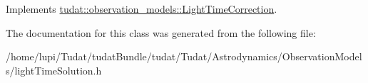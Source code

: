 Implements \hyperlink{classtudat_1_1observation__models_1_1LightTimeCorrection_a75c56b78e1603b14387991fdfffac1ce}{tudat\+::observation\+\_\+models\+::\+Light\+Time\+Correction}.



The documentation for this class was generated from the following file\+:\begin{DoxyCompactItemize}
\item 
/home/lupi/\+Tudat/tudat\+Bundle/tudat/\+Tudat/\+Astrodynamics/\+Observation\+Models/light\+Time\+Solution.\+h\end{DoxyCompactItemize}

